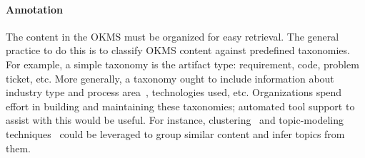 
\vskip -5pt
\paragraph*{Annotation}
The content in the OKMS must be organized for easy retrieval. The general
practice to do this is to classify OKMS content against predefined
taxonomies. For example, a simple taxonomy is the artifact type: requirement,
code, problem ticket, etc. More generally, a taxonomy ought to include
information about industry type and process area~\cite{apqc,bph}, technologies
used, etc. Organizations spend effort in building and maintaining these
taxonomies; automated tool support to assist with this would be useful. For
instance, clustering~\cite{Berkhin06} and topic-modeling
techniques~\cite{Blei:2012} could be leveraged to group similar content and
infer topics from them.

